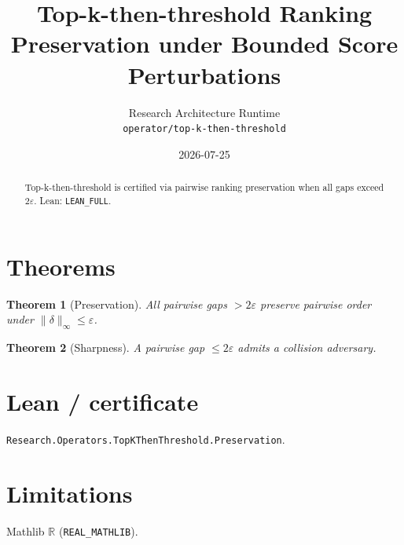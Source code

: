 \documentclass[11pt]{article}
\title{Top-k-then-threshold Ranking Preservation under Bounded Score Perturbations}
\author{Research Architecture Runtime \\ \texttt{operator/top-k-then-threshold}}
\date{2026-07-25}
\newtheorem{theorem}{Theorem}
\begin{document}
\maketitle
\begin{abstract}
Top-k-then-threshold is certified via pairwise ranking preservation when all gaps exceed $2\varepsilon$. Lean: \texttt{LEAN\_FULL}.
\end{abstract}
\section{Theorems}
\begin{theorem}[Preservation]
All pairwise gaps $>2\varepsilon$ preserve pairwise order under $\|\delta\|_\infty\le\varepsilon$.
\end{theorem}
\begin{theorem}[Sharpness]
A pairwise gap $\le 2\varepsilon$ admits a collision adversary.
\end{theorem}
\section{Lean / certificate}
\texttt{Research.Operators.TopKThenThreshold.Preservation}.
\section{Limitations}
Mathlib $\mathbb{R}$ (\texttt{REAL\_MATHLIB}).
\end{document}
